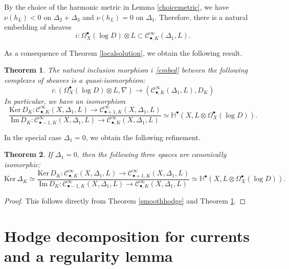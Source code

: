 \documentclass[english]{amsart}
\newcommand{\cC}{\mathcal{C}}
\newcommand{\im}{\mathrm{Im} \,}
\renewcommand{\ker}{\mathrm{Ker} \,}
\newtheorem{thm}{Theorem}[section]
\numberwithin{equation}{thm}
\begin{document}
By the choice of the harmonic metric in Lemma \ref{choicemetric}, we have
$\nu(h_L) < 0$ on $\Delta_2 + \Delta_3$ and $\nu(h_L) = 0$ on $\Delta_1$.
Therefore, there is a natural embedding of sheaves
\begin{equation}\label{embed}
i: \Omega_X^\bullet(\log D) \otimes L
\subset
\cC^\infty_{\bullet,K}(\Delta_1,L).
\end{equation}

As a consequence of Theorem \ref{localsolution}, we obtain the following result.

\begin{thm}\label{quasiiso}
		The natural inclusion morphism $i$ \eqref{embed}  between the following complexes of sheaves is a quasi-isomorphism:
	\[
i:	(\Omega_X^\bullet(\log D) \otimes L, \nabla)
	\longrightarrow
 (	\cC^\infty_{\bullet,K}(\Delta_1,L), D_K)
	\]
	In particular, we have an isomorphism
\[ 
\frac{\ker D_K : \cC^\infty_{\bullet,K}(X, \Delta_1, L) \to \cC^\infty_{\bullet+1,K}(X, \Delta_1, L)}
{\im D_K : \cC^\infty_{\bullet-1,K}(X, \Delta_1, L) \to \cC^\infty_{\bullet,K}(X, \Delta_1, L)}
\simeq \mathbb{H}^\bullet (X, L \otimes \Omega_X^\bullet(\log D)).
\]
\end{thm}

In the special case $\Delta_1 = 0$, we obtain the following refinement.

\begin{thm}\label{L2cohoisom}
If $\Delta_1 = 0$, then the following three spaces are canonically isomorphic:
\[
\ker \Delta_K \simeq 
\frac{\ker D_K: \cC^\infty_{\bullet,K}(X, \Delta_1, L) \to \cC^\infty_{\bullet+1,K}(X, \Delta_1, L)}
{\im D_K: \cC^\infty_{\bullet-1,K}(X, \Delta_1, L) \to \cC^\infty_{\bullet,K}(X, \Delta_1, L)}
\simeq \mathbb{H}^\bullet (X, L \otimes \Omega_X^\bullet(\log D)).
\]
\end{thm}

\begin{proof}
	This follows directly from Theorem \ref{smoothhodge} and Theorem \ref{quasiiso}.
\end{proof}


\section{Hodge decomposition for currents and a regularity lemma}\label{currentsect}
\end{document}
